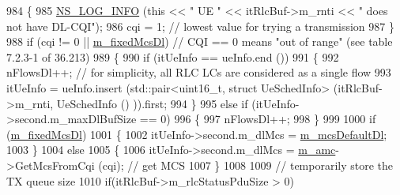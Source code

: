 \begin{DoxyCode}
984                                 \{
985                                         \hyperlink{group__logging_gafbd73ee2cf9f26b319f49086d8e860fb}{NS\_LOG\_INFO} (\textcolor{keyword}{this} << \textcolor{stringliteral}{" UE "} << itRlcBuf->m\_rnti << \textcolor{stringliteral}{"
       does not have DL-CQI"});
986                                         cqi = 1; \textcolor{comment}{// lowest value for trying a transmission}
987                                 \}
988                                 \textcolor{keywordflow}{if} (cqi != 0 || \hyperlink{classns3_1_1MmWaveFlexTtiMacScheduler_a310495cea515a335d1dfcc4d623b9b0a}{m\_fixedMcsDl})       \textcolor{comment}{// CQI == 0 means "out of
       range" (see table 7.2.3-1 of 36.213)}
989                                 \{
990                                         \textcolor{keywordflow}{if} (itUeInfo == ueInfo.end ())
991                                         \{
992                                                 nFlowsDl++;  \textcolor{comment}{// for simplicity, all RLC LCs are considered
       as a single flow}
993                                                 itUeInfo = ueInfo.insert (std::pair<uint16\_t, struct
       UeSchedInfo> (itRlcBuf->m\_rnti, UeSchedInfo () )).first;
994                                         \}
995                                         \textcolor{keywordflow}{else} \textcolor{keywordflow}{if} (itUeInfo->second.m\_maxDlBufSize == 0)
996                                         \{
997                                                 nFlowsDl++;
998                                         \}
999 
1000                                         \textcolor{keywordflow}{if} (\hyperlink{classns3_1_1MmWaveFlexTtiMacScheduler_a310495cea515a335d1dfcc4d623b9b0a}{m\_fixedMcsDl})
1001                                         \{
1002                                                 itUeInfo->second.m\_dlMcs = 
      \hyperlink{classns3_1_1MmWaveFlexTtiMacScheduler_ae439c9faae5c2544276b639aa2778521}{m\_mcsDefaultDl};
1003                                         \}
1004                                         \textcolor{keywordflow}{else}
1005                                         \{
1006                                                 itUeInfo->second.m\_dlMcs = \hyperlink{classns3_1_1MmWaveFlexTtiMacScheduler_a80d0b9fd279dd5c33c52cf0833d264da}{m\_amc}->GetMcsFromCqi (cqi);
        \textcolor{comment}{// get MCS}
1007                                         \}
1008 
1009                                         \textcolor{comment}{// temporarily store the TX queue size}
1010                                         \textcolor{keywordflow}{if}(itRlcBuf->m\_rlcStatusPduSize > 0)

\end{DoxyCode}
